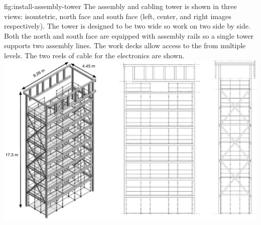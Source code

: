 \begin{dunefigure}{fig:install-assembly-tower}
  {The  assembly and cabling tower is shown in three views: isomtetric, north face and south face (left, center, and right images respectively). 
  The tower is designed to be two  wide so work on two  side by side. Both the north and south face are equipped with assembly rails so a single tower supports two assembly lines.
  The work decks allow access to the  from multiple levels.
  The two reels of cable for the electronics are shown. }
\includegraphics[width=.95\textwidth]{graphics/install-assembly-tower.pdf}
\end{dunefigure}



